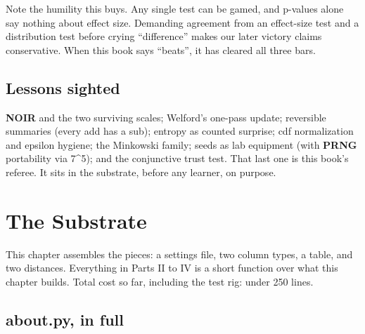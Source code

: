 \documentclass[
  justified]{tufte-book}
\begin{document}
Note the humility this buys. Any single test can be gamed, and p-values
alone say nothing about effect size. Demanding agreement from an
effect-size test and a distribution test before crying ``difference''
makes our later victory claims conservative. When this book says
``beats'', it has cleared all three bars.

\section{Lessons sighted}\label{lessons-sighted-1}

\textbf{NOIR} and the two surviving scales; Welford's one-pass update;
reversible summaries (every add has a sub); entropy as counted surprise;
cdf normalization and epsilon hygiene; the Minkowski family; seeds as
lab equipment (with \textbf{PRNG} portability via 7\^{}5); and the
conjunctive trust test. That last one is this book's referee. It sits in
the substrate, before any learner, on purpose.

\chapter{The Substrate}\label{the-substrate}

This chapter assembles the pieces: a settings file, two column types, a
table, and two distances. Everything in Parts II to IV is a short
function over what this chapter builds. Total cost so far, including the
test rig: under 250 lines.

\section{about.py, in full}\label{about.py-in-full}
\end{document}
